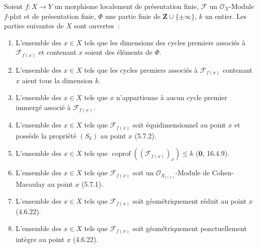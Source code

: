\begin{theorem}[12.1.1]
Soient $f:X\to Y$ un morphisme localement de présentation finie, $\mathcal F$
un $\mathcal O_X$-Module $f$-plat et de présentation finie, $\Phi$ une partie
finie de $\mathbf Z\cup\{\pm\infty\}$, $k$ un entier. Les parties suivantes de
$X$ sont ouvertes~:
\begin{enumerate}[label=\textup{(\roman*)}]
  \item L'ensemble des $x\in X$ tels que les dimensions des cycles premiers
  associés à $\mathcal F_{f(x)}$ et contenant $x$ soient des éléments de
  $\Phi$.
  \item L'ensemble des $x\in X$ tels que les cycles premiers associés à
  $\mathcal F_{f(x)}$ contenant $x$ aient tous la dimension $k$.
  \item L'ensemble des $x\in X$ tels que $x$ n'appartienne à aucun cycle
  premier immergé associé à $\mathcal F_{f(x)}$.
  \item L'ensemble des $x\in X$ tels que $\mathcal F_{f(x)}$ soit
  \textup{équidimensionnel} au point $x$ et possède la propriété $(S_k)$ au point $x$
  \textup{(5.7.2)}.
  \item L'ensemble des $x\in X$ tels que
  $\operatorname{coprof}((\mathcal F_{f(x)})_x)\leq k$
  \textup{($\mathbf 0$, 16.4.9)}.
  \item L'ensemble des $x\in X$ tels que $\mathcal F_{f(x)}$ soit un
  $\mathcal O_{X_{f(x)}}$-Module de Cohen-Macaulay au point $x$ \textup{(5.7.1)}.
  \item L'ensemble des $x\in X$ tels que $\mathcal F_{f(x)}$ soit
  géométriquement réduit au point $x$ \textup{(4.6.22)}.
  \item L'ensemble des $x\in X$ tels que $\mathcal F_{f(x)}$ soit
  géométriquement ponctuellement intègre au point $x$ \textup{(4.6.22)}.
\end{enumerate}
\end{theorem}

